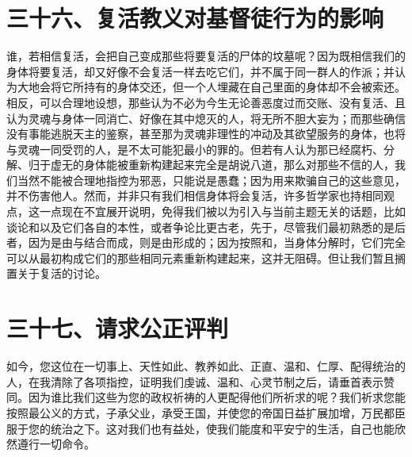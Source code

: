 
\section{三十六、复活教义对基督徒行为的影响}

谁，若相信复活，会把自己变成那些将要复活的尸体的坟墓呢？因为既相信我们的身体将要复活，却又好像不会复活一样去吃它们，并不属于同一群人的作派；并认为大地会将它所持有的身体交还，但一个人埋藏在自己里面的身体却不会被索还。相反，可以合理地设想，那些认为不必为今生无论善恶度过而交账、没有复活、且认为灵魂与身体一同消亡、好像在其中熄灭的人，将无所不胆大妄为；而那些确信没有事能逃脱天主的鉴察，甚至那为灵魂非理性的冲动及其欲望服务的身体，也将与灵魂一同受罚的人，是不太可能犯最小的罪的。但若有人认为那已经腐朽、分解、归于虚无的身体能被重新构建起来完全是胡说八道，那么对那些不信的人，我们当然不能被合理地指控为邪恶，只能说是愚蠢；因为用来欺骗自己的这些意见，并不伤害他人。然而，并非只有我们相信身体将会复活，许多哲学家也持相同观点，这一点现在不宜展开说明，免得我们被以为引入与当前主题无关的话题，比如谈论和以及它们各自的本性，或者争论比更古老，先于，尽管我们最初熟悉的是后者，因为是由与结合而成，则是由形成的；因为按照和，当身体分解时，它们完全可以从最初构成它们的那些相同元素重新构建起来，这并无阻碍。但让我们暂且搁置关于复活的讨论。\par


\section{三十七、请求公正评判}

如今，您这位在一切事上、天性如此、教养如此、正直、温和、仁厚、配得统治的人，在我清除了各项指控，证明我们虔诚、温和、心灵节制之后，请垂首表示赞同。因为谁比我们这些为您的政权祈祷的人更配得他们所祈求的呢？我们祈求您能按照最公义的方式，子承父业，承受王国，并使您的帝国日益扩展加增，万民都臣服于您的统治之下。这对我们也有益处，使我们能度和平安宁的生活，自己也能欣然遵行一切命令。\par

